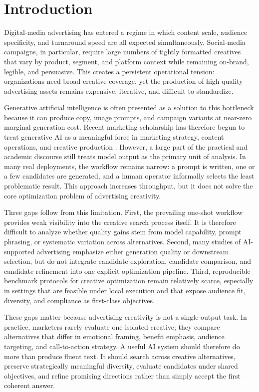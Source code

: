 \documentclass[applsci,article,submit,pdftex,moreauthors]{Definitions/mdpi}
\begin{document}
\section{Introduction}

Digital-media advertising has entered a regime in which content scale, audience specificity, and turnaround speed are all expected simultaneously. Social-media campaigns, in particular, require large numbers of tightly formatted creatives that vary by product, segment, and platform context while remaining on-brand, legible, and persuasive. This creates a persistent operational tension: organizations need broad creative coverage, yet the production of high-quality advertising assets remains expensive, iterative, and difficult to standardize.

Generative artificial intelligence is often presented as a solution to this bottleneck because it can produce copy, image prompts, and campaign variants at near-zero marginal generation cost. Recent marketing scholarship has therefore begun to treat generative AI as a meaningful force in marketing strategy, content operations, and creative production \citep{grewal2025,heitmann2024,gastmann2025}. However, a large part of the practical and academic discourse still treats model output as the primary unit of analysis. In many real deployments, the workflow remains narrow: a prompt is written, one or a few candidates are generated, and a human operator informally selects the least problematic result. This approach increases throughput, but it does not solve the core optimization problem of advertising creativity.

Three gaps follow from this limitation. First, the prevailing one-shot workflow provides weak visibility into the creative search process itself. It is therefore difficult to analyze whether quality gains stem from model capability, prompt phrasing, or systematic variation across alternatives. Second, many studies of AI-supported advertising emphasize either generation quality or downstream selection, but do not integrate candidate exploration, candidate comparison, and candidate refinement into one explicit optimization pipeline. Third, reproducible benchmark protocols for creative optimization remain relatively scarce, especially in settings that are feasible under local execution and that expose audience fit, diversity, and compliance as first-class objectives.

These gaps matter because advertising creativity is not a single-output task. In practice, marketers rarely evaluate one isolated creative; they compare alternatives that differ in emotional framing, benefit emphasis, audience targeting, and call-to-action strategy. A useful AI system should therefore do more than produce fluent text. It should search across creative alternatives, preserve strategically meaningful diversity, evaluate candidates under shared objectives, and refine promising directions rather than simply accept the first coherent answer.
\end{document}
